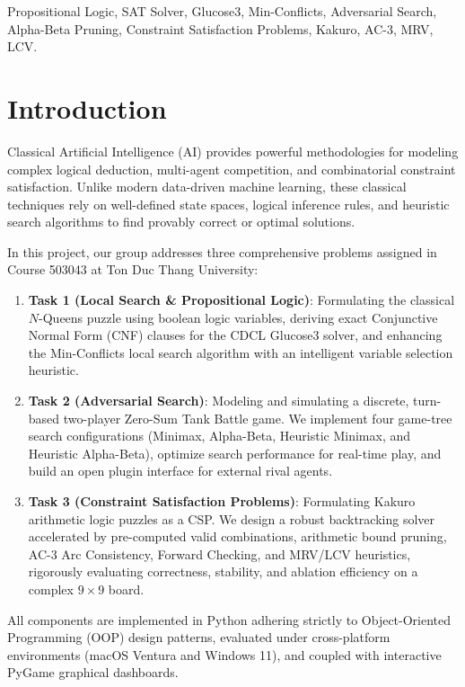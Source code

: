 \documentclass[conference]{IEEEtran}
\begin{document}
\begin{IEEEkeywords}
Propositional Logic, SAT Solver, Glucose3, Min-Conflicts, Adversarial Search, Alpha-Beta Pruning, Constraint Satisfaction Problems, Kakuro, AC-3, MRV, LCV.
\end{IEEEkeywords}

\section{Introduction}
Classical Artificial Intelligence (AI) provides powerful methodologies for modeling complex logical deduction, multi-agent competition, and combinatorial constraint satisfaction. Unlike modern data-driven machine learning, these classical techniques rely on well-defined state spaces, logical inference rules, and heuristic search algorithms to find provably correct or optimal solutions.

In this project, our group addresses three comprehensive problems assigned in Course 503043 at Ton Duc Thang University:
\begin{enumerate}
    \item \textbf{Task 1 (Local Search \& Propositional Logic)}: Formulating the classical $N$-Queens puzzle using boolean logic variables, deriving exact Conjunctive Normal Form (CNF) clauses for the CDCL Glucose3 solver, and enhancing the Min-Conflicts local search algorithm with an intelligent variable selection heuristic.
    \item \textbf{Task 2 (Adversarial Search)}: Modeling and simulating a discrete, turn-based two-player Zero-Sum Tank Battle game. We implement four game-tree search configurations (Minimax, Alpha-Beta, Heuristic Minimax, and Heuristic Alpha-Beta), optimize search performance for real-time play, and build an open plugin interface for external rival agents.
    \item \textbf{Task 3 (Constraint Satisfaction Problems)}: Formulating Kakuro arithmetic logic puzzles as a CSP. We design a robust backtracking solver accelerated by pre-computed valid combinations, arithmetic bound pruning, AC-3 Arc Consistency, Forward Checking, and MRV/LCV heuristics, rigorously evaluating correctness, stability, and ablation efficiency on a complex $9 \times 9$ board.
\end{enumerate}

All components are implemented in Python adhering strictly to Object-Oriented Programming (OOP) design patterns, evaluated under cross-platform environments (macOS Ventura and Windows 11), and coupled with interactive PyGame graphical dashboards.
\end{document}
